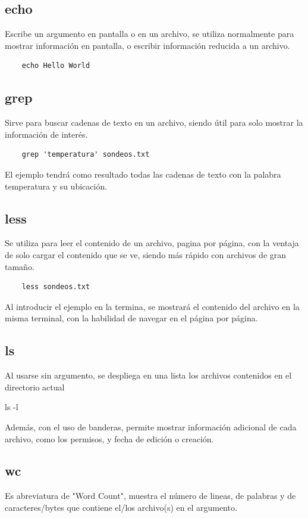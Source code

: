 \documentclass[a4paper]{article}
\begin{document}
\subsection*{echo}

Escribe un argumento en pantalla o en un archivo, se utiliza normalmente para mostrar información en pantalla, o escribir información reducida a un archivo.

\begin{verbatim}
	echo Hello World
\end{verbatim}


\subsection*{grep}
Sirve para buscar cadenas de texto en un archivo, siendo útil para solo mostrar la información de interés.

\begin{verbatim}
	grep 'temperatura' sondeos.txt
\end{verbatim}

El ejemplo tendrá como resultado todas las cadenas de texto con la palabra temperatura y su ubicación.

\subsection*{less}
Se utiliza para leer el contenido de un archivo, pagina por página, con la ventaja de solo cargar el contenido que se ve, siendo más rápido con archivos de gran tamaño.

\begin{verbatim}
	less sondeos.txt
\end{verbatim}

Al introducir el ejemplo en la termina, se mostrará el contenido del archivo en la misma terminal, con la habilidad de navegar en el página por página.

\subsection*{ls}
Al usarse sin argumento, se despliega en una lista los archivos contenidos en el directorio actual

ls -l

Además, con el uso de banderas, permite mostrar información adicional de cada archivo, como los permisos, y fecha de edición o creación.


\subsection*{wc}
Es abreviatura de "Word Count", muestra el número de lineas, de palabras y de caracteres/bytes que contiene el/los archivo(s) en el argumento.
\end{document}
